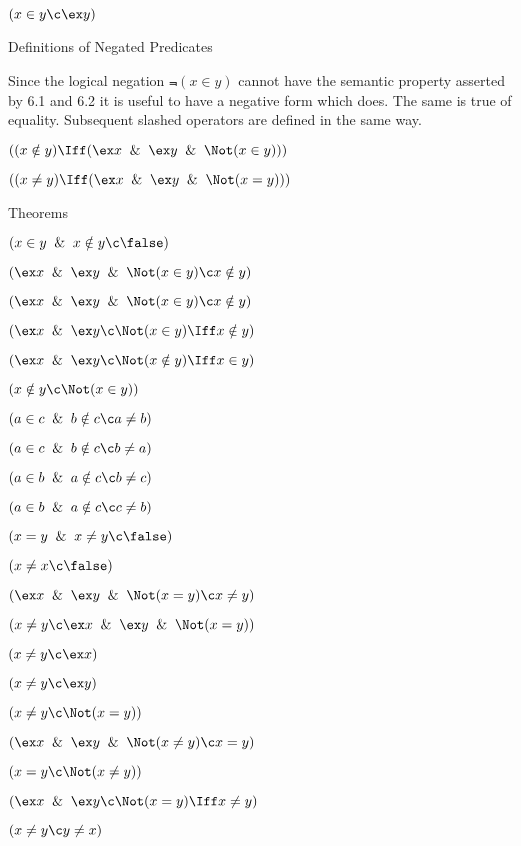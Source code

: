  $(x \in y \c \ex y)$
	\lineb

\noindent{}Definitions of Negated Predicates

Since the logical negation $\Not(x \in y)$ cannot have the semantic property asserted
by 6.1 and 6.2 it is useful to have  a negative form which does.  The same
is true of equality.  Subsequent slashed operators are defined
in the same way.
	\lineb


 $((x \notin y) \Iff (\ex x \And \ex y \And \Not (x \in y)))$

 $((x \ne y) \Iff  (\ex x \And \ex y \And \Not (x = y)))$
	\lineb

\noindent{}Theorems

 $(x \in y \And x \notin y \c \false)$

 $(\ex x \And \ex y \And \Not(x \in y)\c x\notin y)$

 $(\ex x \And \ex y \And \Not(x \in y) \c x \notin y)$

 $(\ex x \And \ex y \c \Not(x \in y) \Iff x \notin y)$

 $(\ex x \And \ex y \c \Not(x \notin y) \Iff x \in y)$

 $(x \notin y \c \Not(x \in y))$

 $(a \in c \And b \notin c \c a \ne b)$

 $(a \in c \And b \notin c \c b \ne a)$

 $(a \in b \And a \notin c \c b \ne c)$

 $(a \in b \And a \notin c \c c \ne b)$

 $(x = y \And x \ne y \c \false)$

 $(x \ne x \c \false)$

 $(\ex x \And \ex y \And \Not(x = y)\c x\ne y)$

 $(x \ne y \c \ex x \And \ex y \And \Not(x = y))$

 $(x \ne y \c \ex x)$

 $(x \ne y \c \ex y)$

 $(x \ne y \c \Not(x = y))$

 $(\ex x \And \ex y \And \Not(x\ne y)\c x=y)$

 $(x = y \c \Not(x \ne y))$

 $(\ex x \And \ex y \c \Not(x = y)\Iff x\ne y)$

 $(x \ne y \c y \ne x)$

